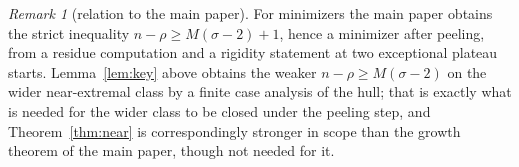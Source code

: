 \documentclass[11pt]{article}
\theoremstyle{plain}
\theoremstyle{definition}
\theoremstyle{remark}
\newtheorem{remark}[theorem]{Remark}
\begin{document}
\begin{remark}[relation to the main paper]\label{rem:whyclass}
For minimizers the main paper obtains the strict inequality \(n-\rho\ge M(\sigma-2)+1\),
hence a minimizer after peeling, from a residue computation and a rigidity statement at
two exceptional plateau starts. Lemma~\ref{lem:key} above obtains the weaker
\(n-\rho\ge M(\sigma-2)\) on the wider near-extremal class by a finite case analysis of
the hull; that is exactly what is needed for the wider class to be closed under the
peeling step, and Theorem~\ref{thm:near} is correspondingly stronger in scope than the
growth theorem of the main paper, though not needed for it.
\end{remark}



\end{document}
